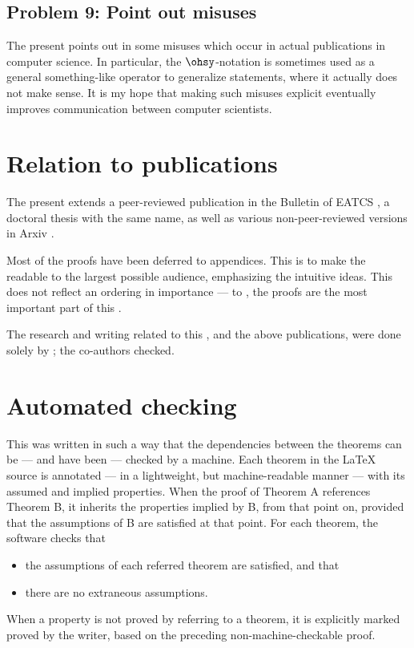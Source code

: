 \documentclass[b5paper, english, oneside]{memoir}
\begin{document}
\subsection{Problem 9: Point out misuses}

The present \manuscript{} points out in  some misuses which occur in actual publications in computer science. In particular, the $\ohsy$-notation is sometimes used as a general something-like operator to generalize statements, where it actually does not make sense. It is my hope that making such misuses explicit eventually improves communication between computer scientists.

\section{Relation to publications}

The present \manuscript{} extends a peer-reviewed publication in the Bulletin of EATCS \cite{ONotationBeatcs}, a doctoral thesis with the same name, as well as various non-peer-reviewed versions in Arxiv \cite{ONotationArxiv}. 

Most of the proofs have been deferred to appendices. This is to make the \manuscript{} readable to the largest possible audience, emphasizing the intuitive ideas. This does not reflect an ordering in importance --- to \me{}, the proofs are the most important part of this \manuscript{}.

The research and writing related to this \manuscript{}, and the above publications, were done solely by \kr; the co-authors checked.

\section{Automated checking}

This \manuscript{} was written in such a way that the dependencies between the theorems can be --- and have been --- checked by a machine. Each theorem in the \LaTeX{} source is annotated --- in a lightweight, but machine-readable manner --- with its assumed and implied properties. When the proof of Theorem A references Theorem B, it inherits the properties implied by B, from that point on, provided that the assumptions of B are satisfied at that point. For each theorem, the software checks that
\begin{itemize}
\item the assumptions of each referred theorem are satisfied, and that
\item there are no extraneous assumptions.
\end{itemize}
When a property is not proved by referring to a theorem, it is explicitly marked proved by the writer, based on the preceding non-machine-checkable proof. 
\end{document}
